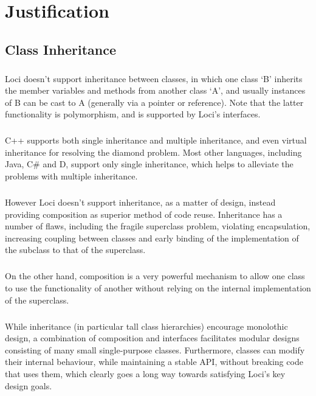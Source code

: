 \documentclass[12pt,twoside,notitlepage]{report}
\begin{document}
\chapter{Justification}

\section{Class Inheritance}

\paragraph{}
Loci doesn't support inheritance between classes, in which one class `B' inherits the member variables and methods from another class `A', and usually instances of B can be cast to A (generally via a pointer or reference). Note that the latter functionality is polymorphism, and is supported by Loci's interfaces.

\paragraph{}
C++ supports both single inheritance and multiple inheritance, and even virtual inheritance for resolving the diamond problem. Most other languages, including Java, C\# and D, support only single inheritance, which helps to alleviate the problems with multiple inheritance.

\paragraph{}
However Loci doesn't support inheritance, as a matter of design, instead providing composition as superior method of code reuse. Inheritance has a number of flaws, including the fragile superclass problem, violating encapsulation, increasing coupling between classes and early binding of the implementation of the subclass to that of the superclass.

\paragraph{}
On the other hand, composition is a very powerful mechanism to allow one class to use the functionality of another without relying on the internal implementation of the superclass.

\paragraph{}
While inheritance (in particular tall class hierarchies) encourage monolothic design, a combination of composition and interfaces facilitates modular designs consisting of many small single-purpose classes. Furthermore, classes can modify their internal behaviour, while maintaining a stable API, without breaking code that uses them, which clearly goes a long way towards satisfying Loci's key design goals.
\end{document}
